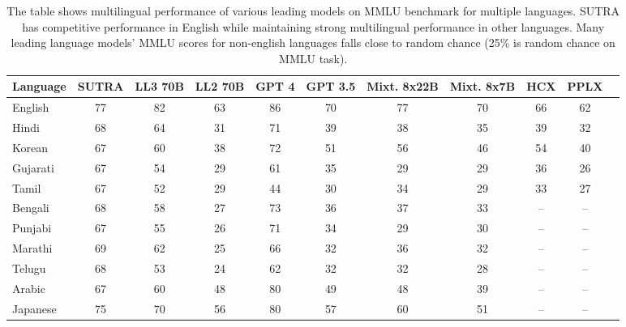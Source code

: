 \documentclass{article}
\begin{document}
\begin{table}[h]
\setlength{\abovecaptionskip}{10pt} %
\setlength{\belowcaptionskip}{5pt} %
\centering
\begin{tabular}{@{}lcccccccccc@{}}
\toprule
\textbf{Language} & \textbf{SUTRA} & \textbf{LL3 70B} & \textbf{LL2 70B} & \textbf{GPT 4} & \textbf{GPT 3.5} & \textbf{Mixt. 8x22B} & \textbf{Mixt. 8x7B} & \textbf{HCX} & \textbf{PPLX} \\ \midrule
English         & 77    & 82          & 63           & 86    & 70       & 77            & 70          & 66          & 62                        \\
Hindi           & 68    & 64          & 31           & 71    & 39       & 38            & 35          & 39          & 32                        \\
Korean          & 67    & 60          & 38           & 72    & 51       & 56            & 46          & 54          & 40                        \\
Gujarati        & 67    & 54          & 29           & 61    & 35       & 29            & 29          & 36          & 26                        \\
Tamil           & 67    & 52          & 29           & 44    & 30       & 34            & 29          & 33          & 27                        \\
Bengali         & 68    & 58          & 27           & 73    & 36       & 37            & 33          & --          & --                        \\
Punjabi         & 67    & 55         & 26           & 71    & 34       & 29            & 30          & --          & --                        \\
Marathi         & 69    & 62          & 25           & 66    & 32       & 36            & 32          & --          & --                        \\
Telugu          & 68    & 53          & 24           & 62    & 32       & 32            & 28          & --          & --                        \\
Arabic          & 67    & 60          & 48           & 80    & 49       & 48            & 39          & --          & --                        \\
Japanese        & 75    & 70          & 56           & 80    & 57       & 60            & 51          & --          & --                        \\ \bottomrule
\end{tabular}
\caption{The table shows multilingual performance of various leading models on MMLU benchmark for multiple languages. SUTRA has competitive performance in English while maintaining strong multilingual performance in other languages. Many leading language models' MMLU scores for non-english languages falls close to random chance (25\% is random chance on MMLU task).}
\label{table:leading_mmlu1}
\end{table}
\end{document}
